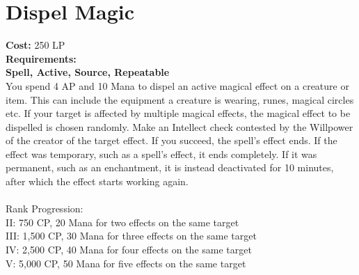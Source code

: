 \section{Dispel Magic}\label{spell:dispelMagic}
\textbf{Cost:} 250 LP\\
\textbf{Requirements:}\\
\textbf{Spell, Active, Source, Repeatable}\\
You spend 4 AP and 10 Mana to dispel an active magical effect on a creature or item.
This can include the equipment a creature is wearing, runes, magical circles etc.
If your target is affected by multiple magical effects, the magical effect to be dispelled is chosen randomly.
Make an Intellect check contested by the Willpower of the creator of the target effect.
If you succeed, the spell's effect ends.
If the effect was temporary, such as a spell's effect, it ends completely.
If it was permanent, such as an enchantment, it is instead deactivated for 10 minutes, after which the effect starts working again.\\
\\
Rank Progression:\\
II: 750 CP, 20 Mana for two effects on the same target\\
III: 1,500 CP, 30 Mana for three effects on the same target\\
IV: 2,500 CP, 40 Mana for four effects on the same target\\
V: 5,000 CP, 50 Mana for five effects on the same target\\